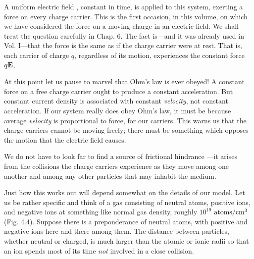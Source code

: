 A uniform electric field , constant in time, is applied to this system,
exerting a force on every charge carrier. This is the first occasion,
in this volume, on which we have considered the force on a
moving charge in an electric field. We shall treat the question carefully
in Chap. 6. The fact is---and it was already used in Vol. I---that
the force is the same as if the charge carrier were at rest. That is,
each carrier of charge $q$, regardless of its motion, experiences the
constant force $q\mathbf{E}$.

At this point let us pause to marvel that Ohm's law is ever obeyed!
A constant force on a free charge carrier ought to produce a constant
acceleration. But constant current density is associated with constant
\emph{velocity}, not constant acceleration. If our system really does
obey Ohm's law, it must be because average \emph{velocity} is proportional
to {force}, for our carriers. This warns us that the charge carriers cannot
be moving freely; there must be something which opposes the
motion that the electric field causes.

We do not have to look far to find a source of frictional hindrance
---it arises from the collisions the charge carriers experience as they
move among one another and among any other particles that may
inhabit the medium.

Just how this works out will depend somewhat on the details of
our model. Let us be rather specific and think of a gas consisting of
neutral atoms, positive ions, and negative ions at something like normal
gas density, roughly $10^{19}$ $\textup{atoms}/\textup{cm}^3$ (Fig. 4.4). Suppose there
is a preponderance of neutral atoms, with positive and negative ions
here and there among them. The distance between particles,
whether neutral or charged, is much larger than the atomic or ionic
radii so that an ion spends most of its time \emph{not} involved in a close
collision.

